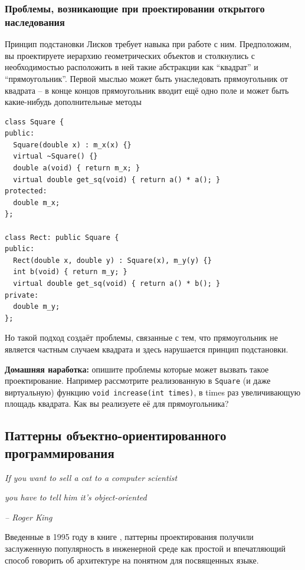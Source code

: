 \documentclass[a4paper,12pt,oneside]{article}
\begin{document}
\subsubsection{Проблемы, возникающие при проектировании открытого наследования}\label{InhProblems}

Принцип подстановки Лисков требует навыка при работе с ним. Предположим, вы проектируете иерархию геометрических объектов и столкнулись с необходимостью расположить в ней такие абстракции как ``квадрат'' и ``прямоугольник''. Первой мыслью может быть унаследовать прямоугольник от квадрата – в конце концов прямоугольник вводит ещё одно поле и может быть какие-нибудь дополнительные методы

\begin{lstlisting}
class Square {
public:
  Square(double x) : m_x(x) {}
  virtual ~Square() {}
  double a(void) { return m_x; }
  virtual double get_sq(void) { return a() * a(); }
protected:
  double m_x;
};

class Rect: public Square {
public:
  Rect(double x, double y) : Square(x), m_y(y) {}
  int b(void) { return m_y; }
  virtual double get_sq(void) { return a() * b(); }
private:
  double m_y;
};
\end{lstlisting}

Но такой подход создаёт проблемы, связанные с тем, что прямоугольник не является частным случаем квадрата и здесь нарушается принцип подстановки. 

\textbf{Домашняя наработка:} опишите проблемы которые может вызвать такое проектирование. Например рассмотрите реализованную в \lstinline!Square! (и даже виртуальную) функцию \lstinline!void increase(int times)!, в times раз увеличивающую площадь квадрата. Как вы реализуете её для прямоугольника?

\pagebreak
\subsection{Паттерны объектно-ориентированного программирования}\label{DesPatterns}

\hfill\textit{If you want to sell a cat to a computer scientist}

\hfill\textit{you have to tell him it's object-oriented}{\vspace{0.5em}}

\hfill\textit{-- Roger King}

Введенные в 1995 году в книге \cite{DPatterns}, паттерны проектирования получили заслуженную популярность в инженерной среде как простой и впечатляющий способ говорить об архитектуре на понятном для посвященных языке.
\end{document}
